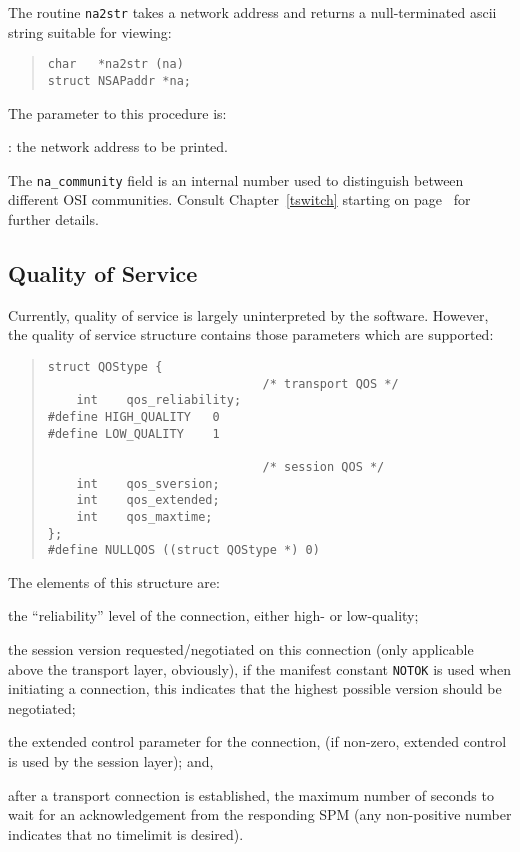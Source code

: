The routine \verb"na2str" takes a network address and returns a
null-ter\-mi\-na\-ted ascii string suitable for viewing:
\begin{quote}\begin{verbatim}
char   *na2str (na)
struct NSAPaddr *na;
\end{verbatim}\end{quote}
The parameter to this procedure is:
\begin{describe}
\item[\verb"na"]: the network address to be printed.
\end{describe}

The \verb"na_community" field is an internal number used to distinguish
between different OSI communities.
Consult Chapter~\ref{tswitch} starting on page~\pageref{tswitch} for further
details.

\subsection	{Quality of Service}\label{tsap:qos}
Currently, quality of service is largely uninterpreted by the software.
However,
the quality of service structure contains those parameters which are supported:
\begin{quote}\small\begin{verbatim}
struct QOStype {
                              /* transport QOS */
    int    qos_reliability;
#define HIGH_QUALITY   0
#define LOW_QUALITY    1

                              /* session QOS */
    int    qos_sversion;
    int    qos_extended;
    int    qos_maxtime;
};
#define NULLQOS ((struct QOStype *) 0)
\end{verbatim}\end{quote}
The elements of this structure are:
\begin{describe}
\item[\verb"qos\_reliability":] the ``reliability'' level of the connection,
either high- or low-quality;

\item[\verb"qos\_sversion":] the session version requested/negotiated on this
connection (only applicable above the transport layer, obviously),
if the manifest constant \verb"NOTOK" is used when initiating a connection,
this indicates that the highest possible version should be negotiated;

\item[\verb"qos\_extended":] the extended control parameter for the connection,
(if non-zero, extended control is used by the session layer);
and,

\item[\verb"qos\_maxtime":] after a transport connection is established,
the maximum number of seconds to wait for an acknowledgement from the
responding SPM
(any non-positive number indicates that no timelimit is desired).
\end{describe}

